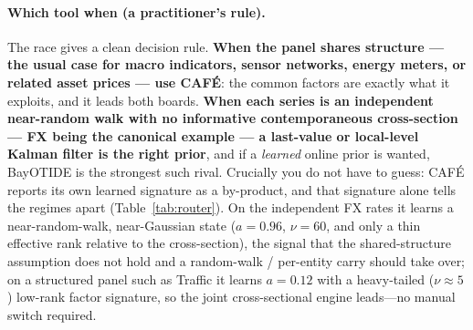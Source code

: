 \documentclass[10pt,twocolumn]{article}
\newcommand{\cafe}{CAF\'E}
\begin{document}
\paragraph{Which tool when (a practitioner's rule).} The race gives a clean
decision rule. \textbf{When the panel shares structure --- the usual case for
macro indicators, sensor networks, energy meters, or related asset prices --- use
\cafe{}}: the common factors are exactly what it exploits, and it leads both
boards. \textbf{When each series is an independent near-random walk with no
informative contemporaneous cross-section --- FX being the canonical example --- a
last-value or local-level Kalman filter is the right prior}, and if a \emph{learned}
online prior is wanted, BayOTIDE is the strongest such rival. Crucially you do not
have to guess: \cafe{} reports its own learned signature as a by-product, and that
signature alone tells the regimes apart (Table~\ref{tab:router}). On the independent
FX rates it learns a near-random-walk, near-Gaussian state ($a{=}0.96$, $\nu{=}60$,
and only a thin effective rank relative to the cross-section), the signal that the
shared-structure assumption does not hold and a random-walk / per-entity carry should
take over; on a structured panel such as Traffic it learns $a{=}0.12$ with a
heavy-tailed ($\nu{\approx}5$) low-rank factor signature, so the joint cross-sectional
engine leads---no manual switch required.

\end{document}
